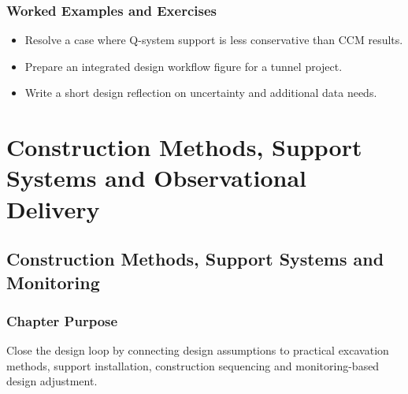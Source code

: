 \documentclass[12pt,oneside]{book}
\begin{document}
\section{Worked Examples and Exercises}
\begin{itemize}
    \item Resolve a case where Q-system support is less conservative than CCM results.
    \item Prepare an integrated design workflow figure for a tunnel project.
    \item Write a short design reflection on uncertainty and additional data needs.
\end{itemize}

\part{Construction Methods, Support Systems and Observational Delivery}

\chapter{Construction Methods, Support Systems and Monitoring}

\section{Chapter Purpose}
Close the design loop by connecting design assumptions to practical excavation methods, support installation, construction sequencing and monitoring-based design adjustment.
\end{document}
